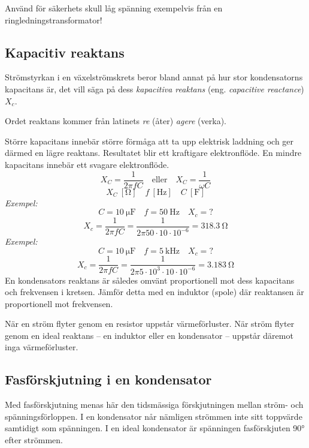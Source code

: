 Använd för säkerhets skull låg spänning exempelvis från en ringledningstransformator!

\subsection{Kapacitiv reaktans}
\label{kapacitiv_reaktans}

Strömstyrkan i en växelströmskrets beror bland annat på hur stor kondensatorns
kapacitans är, det vill säga på dess \emph{kapacitiva reaktans} (eng.
\emph{capacitive reactance}) \(X_c\).

Ordet reaktans kommer från latinets \emph{re} (åter) \emph{agere} (verka).

Större kapacitans innebär större förmåga att ta upp elektrisk laddning och ger
därmed en lägre reaktans. Resultatet blir ett kraftigare elektronflöde.
En mindre kapacitans innebär ett svagare elektronflöde.
\[X_C = \dfrac{1}{2\pi fC}\quad \text{eller}\quad X_C = \dfrac{1}{\omega C}\]
\[X_C\ [\si{\ohm}]\quad f\ [\si{\hertz}]\quad C\ [\si{\farad}]\]
\emph{Exempel:}
\[C = \SI{10}{\micro\farad}\quad f = \SI{50}{\hertz}\quad X_c = ?\]
\[X_c = \dfrac{1}{2\pi fC} = \dfrac{1}{2\pi 50 \cdot 10 \cdot 10^{-6}} = \SI{318,3}{\ohm}\]
\emph{Exempel:}
\[C = \SI{10}{\micro\farad}\quad f = \SI{5}{\kilo\hertz}\quad X_c = ?\]
\[X_c = \dfrac{1}{2\pi fC} = \dfrac{1}{2\pi 5 \cdot 10^3 \cdot 10 \cdot 10^{-6}}
= \SI{3,183}{\ohm}\]
En kondensators reaktans är således omvänt proportionell mot dess kapacitans
och frekvensen i kretsen.
Jämför detta med en induktor (spole) där reaktansen är proportionell mot frekvensen.

När en ström flyter genom en resistor uppstår värmeförluster. När ström flyter genom 
en ideal reaktans -- en induktor eller en kondensator -- uppstår däremot inga 
värmeförluster.

\subsection{Fasförskjutning i en kondensator}

Med fasförskjutning menas här den tidsmässiga förskjutningen mellan ström- och
spänningsförloppen. I en kondensator når nämligen strömmen inte sitt toppvärde
samtidigt som spänningen.
I en ideal kondensator är spänningen fasförskjuten \ang{90} efter strömmen.

